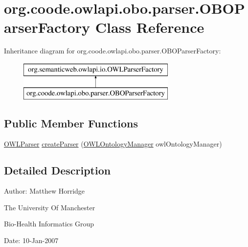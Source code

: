\hypertarget{classorg_1_1coode_1_1owlapi_1_1obo_1_1parser_1_1_o_b_o_parser_factory}{\section{org.\-coode.\-owlapi.\-obo.\-parser.\-O\-B\-O\-Parser\-Factory Class Reference}
\label{classorg_1_1coode_1_1owlapi_1_1obo_1_1parser_1_1_o_b_o_parser_factory}
}
Inheritance diagram for org.\-coode.\-owlapi.\-obo.\-parser.\-O\-B\-O\-Parser\-Factory\-:\begin{figure}[H]
\begin{center}
\leavevmode
\includegraphics[height=2.000000cm]{classorg_1_1coode_1_1owlapi_1_1obo_1_1parser_1_1_o_b_o_parser_factory}
\end{center}
\end{figure}
\subsection*{Public Member Functions}
\begin{DoxyCompactItemize}
\item 
\hyperlink{interfaceorg_1_1semanticweb_1_1owlapi_1_1io_1_1_o_w_l_parser}{O\-W\-L\-Parser} \hyperlink{classorg_1_1coode_1_1owlapi_1_1obo_1_1parser_1_1_o_b_o_parser_factory_a2efb8358a0dc3e8d8bb8a5eae59f4d88}{create\-Parser} (\hyperlink{interfaceorg_1_1semanticweb_1_1owlapi_1_1model_1_1_o_w_l_ontology_manager}{O\-W\-L\-Ontology\-Manager} owl\-Ontology\-Manager)
\end{DoxyCompactItemize}


\subsection{Detailed Description}
Author\-: Matthew Horridge\par
 The University Of Manchester\par
 Bio-\/\-Health Informatics Group\par
 Date\-: 10-\/\-Jan-\/2007\par
\par
 

